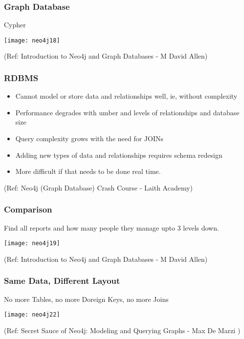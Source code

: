 \begin{frame}[fragile]\frametitle{Graph Database}
Cypher

\begin{center}
\texttt{[image: neo4j18]}
\end{center}	    

{\tiny (Ref: Introduction to Neo4j and Graph Databases
 - M David Allen)}

\end{frame}

\begin{frame}\frametitle{RDBMS}

\begin{itemize}
\item Cannot model or store data and relationships well, ie, without complexity
\item Performance degrades with umber and levels of relationships and database size
\item Query complexity grows with the need for JOINs
\item Adding new types of data and relationships requires schema redesign
\item More difficult if that needs to be done real time.
\end{itemize}

{\tiny (Ref: Neo4j (Graph Database) Crash Course - Laith Academy)}
\end{frame}

\begin{frame}[fragile]\frametitle{Comparison}
Find all reports and how many people they manage upto 3 levels down.

\begin{center}
\texttt{[image: neo4j19]}
\end{center}	    

{\tiny (Ref: Introduction to Neo4j and Graph Databases
 - M David Allen)}

\end{frame}

\begin{frame}[fragile]\frametitle{Same Data, Different Layout}
No more Tables, no more Doreign Keys, no more Joins
\begin{center}
\texttt{[image: neo4j22]}
\end{center}	    

{\tiny (Ref: Secret Sauce of Neo4j: Modeling and Querying Graphs
 - Max De Marzi )}

\end{frame}

